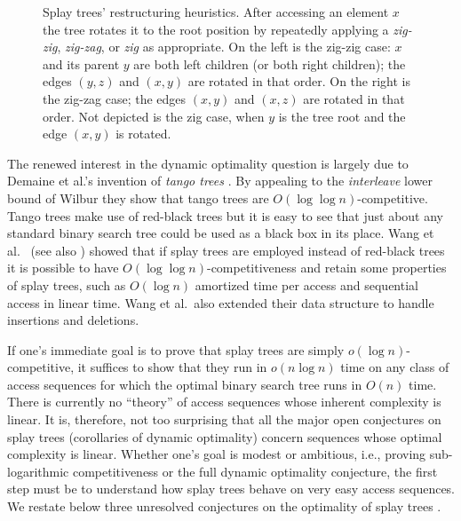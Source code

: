 \documentclass{article}
\begin{document}
\begin{figure}[h!]
\begin{center}
\end{center}
\caption{\label{fig:zigzig-zigzag}Splay trees' restructuring heuristics.  After accessing an element $x$ the tree rotates it to the root
position by repeatedly applying  a {\em zig-zig}, {\em zig-zag}, or {\em zig} as appropriate.
On the left is the zig-zig case: $x$ and its parent $y$ are both left children (or both right children); the edges
$(y,z)$ and $(x,y)$ are rotated in that order.  On the right is the zig-zag case; the edges $(x,y)$ and $(x,z)$ are
rotated in that order.  Not depicted is the zig case, when $y$ is the tree root and the edge $(x,y)$ is rotated.}
\end{figure}

The renewed interest in the dynamic optimality question is largely due to
Demaine et al.'s invention of {\em tango trees} \cite{DHIP04}.  
By appealing to the {\em interleave} lower bound of Wilbur \cite{Wilber89}
they show that tango trees are $O(\log\log n)$-competitive.  Tango trees make use of red-black trees
but it is easy to see that just about any standard binary search tree could be used as a black box in its place.
Wang et al.~\cite{WDS06} (see also \cite{Georg05}) showed that if splay trees are employed
instead of red-black trees it is possible to have $O(\log\log n)$-competitiveness and retain some properties
of splay trees, such as $O(\log n)$ amortized time per access and sequential access in linear time.  
Wang et al.~also extended their data structure to handle insertions and deletions.  

If one's immediate goal is to prove that splay trees are simply $o(\log n)$-competitive, it suffices to show that
they run in $o(n\log n)$ time on any class of access sequences for which the optimal binary search tree runs in $O(n)$ time.
There is currently no ``theory'' of access sequences whose inherent complexity is linear.  It is, therefore, not too surprising that
all the major open conjectures on splay trees (corollaries of dynamic optimality)
concern sequences whose optimal complexity is linear.  
Whether one's goal is modest or ambitious, i.e., proving sub-logarithmic competitiveness or the full dynamic optimality conjecture,
the first step must be to understand how splay trees behave on very easy access sequences.
We restate below three unresolved conjectures on the optimality of splay trees \cite{Tar85,ST85,Lucas91}.
\end{document}
